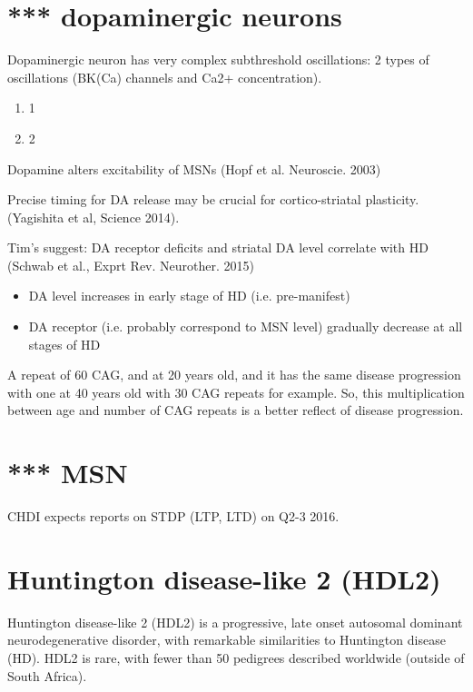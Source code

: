 \section{*** dopaminergic neurons}

Dopaminergic neuron has very complex subthreshold oscillations: 2 types of
oscillations (BK(Ca) channels and Ca2+ concentration).
\begin{enumerate}
  \item 1
  
  \item 2
\end{enumerate}

Dopamine alters excitability of MSNs (Hopf et al. Neuroscie. 2003)

Precise timing for DA release may be crucial for cortico-striatal plasticity. 
(Yagishita et al, Science 2014). 

Tim's suggest:
DA receptor deficits and striatal DA level correlate with HD (Schwab et al.,
Exprt Rev. Neurother. 2015)

\begin{itemize}
  \item DA level increases in early stage of HD (i.e. pre-manifest)
  
  
  \item DA receptor (i.e. probably correspond to MSN level) gradually decrease
  at all stages of HD
\end{itemize}

\begin{mdframed}
A repeat of 60 CAG, and at 20 years old, and it has the same disease progression
with one at 40 years old with 30 CAG repeats for example. So, this
multiplication between age and number of CAG repeats is a better reflect of
disease progression.

\end{mdframed}


\section{*** MSN}

CHDI expects reports on STDP (LTP, LTD) on Q2-3 2016.

\section{Huntington disease-like 2 (HDL2) }
\label{sec:HDL2}
\label{sec:Huntington-disease-like-2}

Huntington disease-like 2 (HDL2) is a progressive, late onset autosomal dominant
neurodegenerative disorder, with remarkable similarities to Huntington disease (HD).
HDL2 is rare, with fewer than 50 pedigrees described worldwide
(outside of South Africa).

